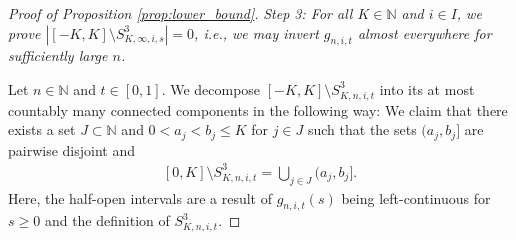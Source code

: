 \documentclass[11pt]{article}
\numberwithin{statement}{section}
\numberwithin{equation}{section}
\theoremstyle{remark}
\newcommand{\N}{\mathbb N}
\begin{document}
\begin{proof}[Proof of Proposition \ref{prop:lower_bound}]
	
	\textit{Step 3: For all $K \in \N$ and $i \in I$, we prove
          $|[-K,K]\setminus S^3_{K,\infty,i,s}| =0$, i.e., we may
          invert $g_{n,i,t}$ almost everywhere for sufficiently large
          $n$.}

	Let $n \in \N$ and $t \in [0,1]$.  We decompose
        $[-K, K] \setminus {S^3_{K,n,i,t}}$ into its at most countably
        many connected components in the following way: We claim that
        there exists a set $J \subset \N$ and $0 < a_j < b_j \leq K$
        for $j \in J$ such that the sets $(a_j,b_j]$ are pairwise
        disjoint and
	\begin{align}
          \label{eq:S3decomp}
	 	 [0,K] \setminus S^3_{K,n,i,t} = \bigcup_{j\in J} (a_j, b_j].
	\end{align}
	Here, the half-open intervals are a result of $g_{n,i,t}(s)$
        being left-continuous for $s \geq 0$ and the definition of
        $S^3_{K,n,i,t}$.
          
		
	

\end{proof}
\end{document}
